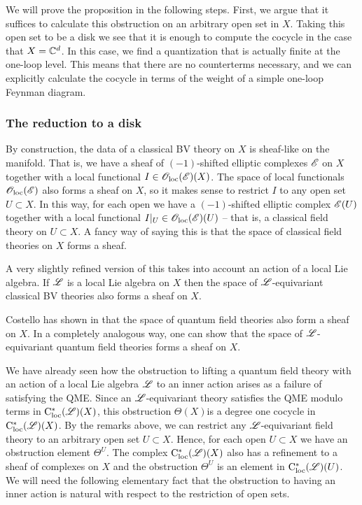 We will prove the proposition in the following steps. 
First, we argue that it suffices to calculate this obstruction on an arbitrary open set in $X$. 
Taking this open set to be a disk we see that it is enough to compute the cocycle in the case that $X = \mathbb C^d$. 
In this case, we find a quantization that is actually finite at the one-loop level. 
This means that there are no counterterms necessary, and we can explicitly calculate the cocycle in terms of the weight of a  simple one-loop Feynman diagram.

\subsubsection{The reduction to a disk}

By construction, the data of a classical BV theory on $X$ is sheaf-like on the manifold. That is, we have a sheaf of $(-1)$-shifted elliptic complexes $\mathscr E$ on $X$ together with a local functional $I \in {\mathscr O}_{\rm loc}(\mathscr E)(X)$. The space of local functionals ${\mathscr O}_{\rm loc}(\mathscr E)$ also forms a sheaf on $X$, so it makes sense to restrict $I$ to any open set $U \subset X$. In this way, for each open we have a $(-1)$-shifted elliptic complex $\mathscr E(U)$ together with a local functional $I |_{U}\in {\mathscr O}_{\rm loc}(\mathscr E)(U)$ -- that is, a classical field theory on $U \subset X$. A fancy way of saying this is that the space of classical field theories on $X$ forms a sheaf. 

A very slightly refined version of this takes into account an action of a local Lie algebra. If $\mathscr L$ is a local Lie algebra on $X$ then the space of $\mathscr L$-equivariant classical BV theories also forms a sheaf on $X$. 

Costello has shown in \cite{cosren} that the space of quantum field theories also form a sheaf on $X$. In a completely analogous way, one can show that the space of $\mathscr L$-equivariant quantum field theories forms a sheaf on $X$. 

We have already seen how the obstruction to lifting a quantum field theory with an action of a local Lie algebra $\mathscr L$ to an inner action arises as a failure of satisfying the QME. Since an $\mathscr L$-equivariant theory satisfies the QME modulo terms in ${\rm C}_{\rm loc}^*(\mathscr L)(X)$, this obstruction $\Theta(X)$is a degree one cocycle in ${\rm C}_{\rm loc}^*(\mathscr L)(X)$. By the remarks above, we can restrict any $\mathscr L$-equivariant field theory to an arbitrary open set $U \subset X$. Hence, for each open $U \subset X$ we have an obstruction element $\Theta^U$. The complex ${\rm C}_{\rm loc}^*(\mathscr L)(X)$ also has a refinement to a sheaf of complexes on $X$ and the obstruction $\Theta^U$ is an element in ${\rm C}_{\rm loc}^*(\mathscr L)(U)$. We will need the following elementary fact that the obstruction to having an inner action is natural with respect to the restriction of open sets.

